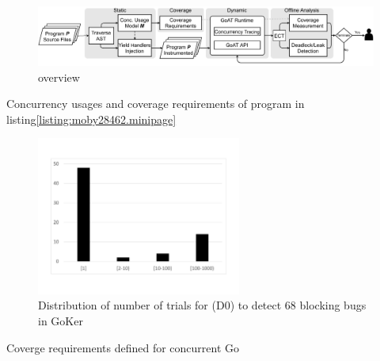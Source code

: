 \begin{figure}[t]
\centering
\includegraphics[width=0.99\linewidth]{goat/figs/GOAT_overview.pdf}
\caption{\goat overview}
\label{fig:goat_workflow}
\end{figure}




\begin{table}[]
\centering
\caption{Concurrency usages and coverage requirements of program in listing\ref{listing:moby28462.minipage}}
\scalebox{0.82}{

}
\label{tab:moby_cov_table}
\end{table}


\begin{figure}[]
\centering
\includegraphics[width=0.6\textwidth]{goat/figs/coverage_motivation.pdf}
\caption{Distribution of number of trials for \goat (D0) to detect 68 blocking bugs in GoKer~\cite{yuan-gobench-cgo21}}
\label{fig:rare_bugs}
\end{figure}






\begin{table}[]
\centering
\caption{Coverge requirements defined for concurrent Go}
\scalebox{0.75}{

}
\label{tab:cov_req}
\end{table}




